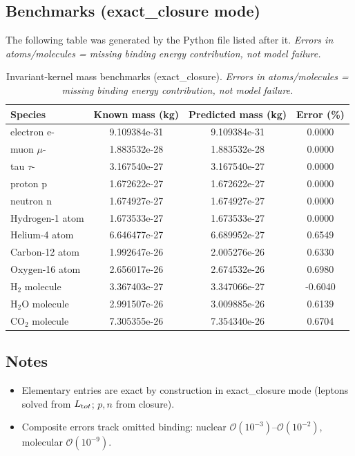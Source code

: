 \documentclass[reprint,aps,onecolumn,nofootinbib]{revtex4-2}
\begin{document}
    \subsection{Benchmarks (exact\_closure mode)}
    \label{sec:benchmarks-exact-closure}
    The following table was generated by the Python file listed after it.
    \emph{Errors in atoms/molecules = missing binding energy contribution, not model failure.}

    \begin{table}[H]
    \centering
    \caption{Invariant-kernel mass benchmarks (exact\_closure). \emph{Errors in atoms/molecules = missing binding energy contribution, not model failure.}}
    \begin{tabular}{lccc}
    \toprule
    Species & Known mass (kg) & Predicted mass (kg) & Error (\%)\\
    \midrule
    electron e- & 9.109384e-31 & 9.109384e-31 & 0.0000\\
    muon $\mu$- & 1.883532e-28 & 1.883532e-28 & 0.0000\\
    tau $\tau$- & 3.167540e-27 & 3.167540e-27 & 0.0000\\
    proton p & 1.672622e-27 & 1.672622e-27 & 0.0000\\
    neutron n & 1.674927e-27 & 1.674927e-27 & 0.0000\\
    Hydrogen-1 atom & 1.673533e-27 & 1.673533e-27 & 0.0000\\
    Helium-4 atom & 6.646477e-27 & 6.689952e-27 & 0.6549\\
    Carbon-12 atom & 1.992647e-26 & 2.005276e-26 & 0.6330\\
    Oxygen-16 atom & 2.656017e-26 & 2.674532e-26 & 0.6980\\
    H$_2$ molecule & 3.367403e-27 & 3.347066e-27 & -0.6040\\
    H$_2$O molecule & 2.991507e-26 & 3.009885e-26 & 0.6139\\
    CO$_2$ molecule & 7.305355e-26 & 7.354340e-26 & 0.6704\\
    \bottomrule
    \end{tabular}\label{tab:benchmarks-exact-closure}
    \end{table}

    \subsection*{Notes}
    \begin{itemize}
    \item Elementary entries are exact by construction in exact\_closure mode (leptons solved from $L_{\textrm tot}$; $p,n$ from closure).
    \item Composite errors track omitted binding: nuclear $\mathcal O(10^{-3})$–$\mathcal O(10^{-2})$, molecular $\mathcal O(10^{-9})$.
    \end{itemize}





        \nocite{*}

        
            
\end{document}

